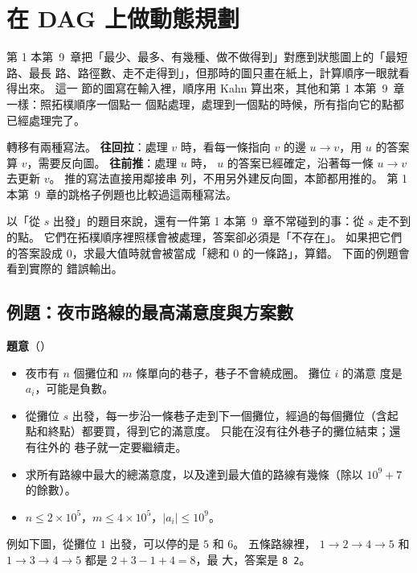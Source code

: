 \section{在 DAG 上做動態規劃}
\label{sec:dag-dp}

第 1 本第~9~章把「最少、最多、有幾種、做不做得到」對應到狀態圖上的「最短路、最長
路、路徑數、走不走得到」，但那時的圖只畫在紙上，計算順序一眼就看得出來。 這一
節的圖寫在輸入裡，順序用 Kahn 算出來，其他和第 1 本第~9~章一樣：照拓樸順序一個點一
個點處理，處理到一個點的時候，所有指向它的點都已經處理完了。

轉移有兩種寫法。 \textbf{往回拉}：處理 $v$ 時，看每一條指向 $v$ 的邊
$u \to v$，用 $u$ 的答案算 $v$，需要反向圖。 \textbf{往前推}：處理 $u$ 時，
$u$ 的答案已經確定，沿著每一條 $u \to v$ 去更新 $v$。 推的寫法直接用鄰接串
列，不用另外建反向圖，本節都用推的。 第 1 本第~9~章的跳格子例題也比較過這兩種寫法。

以「從 $s$ 出發」的題目來說，還有一件第 1 本第~9~章不常碰到的事：從 $s$ 走不到的點。
它們在拓樸順序裡照樣會被處理，答案卻必須是「不存在」。 如果把它們的答案設成
$0$，求最大值時就會被當成「總和 $0$ 的一條路」，算錯。 下面的例題會看到實際的
錯誤輸出。

\subsection{例題：夜市路線的最高滿意度與方案數}
\label{sec:ex-nightmarket}

\textbf{題意}（）

\begin{itemize}
\item 夜市有 $n$ 個攤位和 $m$ 條單向的巷子，巷子不會繞成圈。 攤位 $i$ 的滿意
度是 $a_i$，可能是負數。
\item 從攤位 $s$ 出發，每一步沿一條巷子走到下一個攤位，經過的每個攤位（含起
點和終點）都要買，得到它的滿意度。 只能在沒有往外巷子的攤位結束；還有往外的
巷子就一定要繼續走。
\item 求所有路線中最大的總滿意度，以及達到最大值的路線有幾條（除以
$10^9 + 7$ 的餘數）。
\item $n \le 2 \times 10^5$，$m \le 4 \times 10^5$，$|a_i| \le 10^9$。
\end{itemize}

例如下圖，從攤位 $1$ 出發，可以停的是 $5$ 和 $6$。 五條路線裡，
$1 \to 2 \to 4 \to 5$ 和 $1 \to 3 \to 4 \to 5$ 都是 $2 + 3 - 1 + 4 = 8$，最
大，答案是 \texttt{8 2}。

